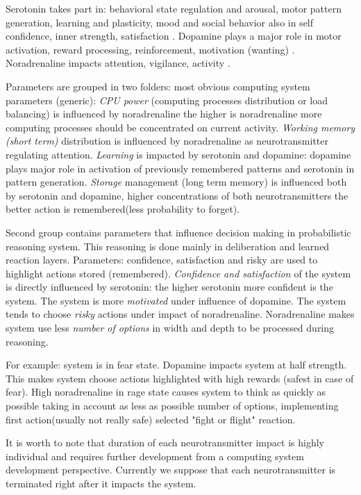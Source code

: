Serotonin takes part in: behavioral state regulation and arousal, motor pattern generation, learning and plasticity, mood and social behavior \cite{anatomic} also in self confidence, inner strength, satisfaction \cite{cubeofemotions}. Dopamine plays a major role in motor activation, reward processing, reinforcement, motivation (wanting) \cite{cubeofemotions, emotionsbraintorobot, roleofemotions}. Noradrenaline impacts attention, vigilance, activity \cite{cubeofemotions}.

Parameters are grouped in two folders: most obvious computing system parameters (generic):
\emph{CPU power} (computing processes distribution or load balancing) is influenced by noradrenaline the higher is noradrenaline more computing processes should be concentrated on current activity.
\emph{Working memory (short term)} distribution is influenced by noradrenaline as neurotransmitter regulating attention.
\emph{Learning} is impacted by serotonin and dopamine: dopamine plays major role in activation of previously remembered patterns and serotonin in pattern generation.
\emph{Storage} management (long term memory) is influenced both by serotonin and dopamine, higher concentrations of both neurotransmitters the better action is remembered(less probability to forget).

Second group contains parameters that influence decision making in probabilistic reasoning system. This reasoning is done mainly in deliberation and learned reaction layers.
Parameters: confidence, satisfaction and risky are used to highlight actions stored (remembered).
\emph{Confidence and satisfaction} of the system is directly influenced by serotonin: the higher serotonin more confident is the system. 
The system is more \emph{motivated} under influence of dopamine.
The system tends to choose \emph{risky} actions under impact of noradrenaline.
Noradrenaline makes system use less \emph{number of options} in width and depth to be processed during reasoning.

For example: system is in fear state. Dopamine impacts system at half strength. This makes system choose actions highlighted with high rewards (safest in case of fear). High noradrenaline in rage state causes system to think as quickly as possible taking in account as less as possible number of options, implementing first action(usually not really safe) selected "fight or flight" reaction.

It is worth to note that duration of each neurotransmitter impact is highly individual and requires further development from a computing system development perspective. Currently we suppose that each neurotransmitter is terminated right after it impacts the system.

